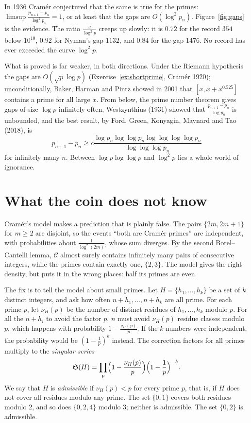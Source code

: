 In 1936 Cramér conjectured that the same is true for the primes: $\limsup\frac{p_{n+1}-p_n}{\log^2p_n}=1$, or at least that the gaps are $O(\log^2p_n)$. Figure~\ref{fig:gaps} is the evidence. The ratio
$\frac g{\log^2p}$ creeps up slowly: it is $0.72$ for the record $354$ below $10^{10}$, $0.92$ for Nyman's gap $1132$, and $0.84$ for the gap $1476$. No record has ever exceeded the curve $\log^2p$.

What is proved is far weaker, in both directions. Under the Riemann hypothesis the gaps are $O(\sqrt p\log p)$ (Exercise~\ref{ex:shortprime}, Cramér 1920); unconditionally, Baker, Harman and Pintz showed in 2001
that $[x,x+x^{0.525}]$ contains a prime for all large $x$. From below, the prime number theorem gives gaps of size $\log p$ infinitely often, Westzynthius (1931) showed that $\frac{p_{n+1}-p_n}{\log p_n}$ is
unbounded, and the best result, by Ford, Green, Konyagin, Maynard and Tao (2018), is
\[
p_{n+1}-p_n\ge c\frac{\log p_n\log\log p_n\log\log\log\log p_n}{\log\log\log p_n}
\]
for infinitely many $n$. Between $\log p\log\log p$ and $\log^2p$ lies a whole world of ignorance.

\section{What the coin does not know}

Cramér's model makes a prediction that is plainly false. The pairs $\{2m,2m+1\}$ for $m\ge2$ are disjoint, so the events ``both are Cramér primes'' are independent, with probabilities about $\frac1{\log^2(2m)}$, whose sum
diverges. By the second Borel--Cantelli lemma, $\mathcal C$ almost surely contains infinitely many pairs of consecutive integers, while the primes contain exactly one, $\{2,3\}$. The model
gives the right density, but puts it in the wrong places: half its primes are even.

The fix is to tell the model about small primes. Let $H=\{h_1,\dots,h_k\}$ be a set of $k$ distinct integers, and ask how often $n+h_1,\dots,n+h_k$ are all prime. For each prime $p$, let $\nu_H(p)$ be
the number of distinct residues of $h_1,\dots,h_k$ modulo $p$. For all the $n+h_i$ to avoid the factor $p$, $n$ must avoid $\nu_H(p)$ residue classes modulo $p$, which happens with probability
$1-\frac{\nu_H(p)}p$. If the $k$ numbers were independent, the probability would be $(1-\frac1p)^k$ instead. The correction factors for all primes multiply to the \emph{singular series}
\[
\mathfrak S(H)=\prod_p\Bigl(1-\frac{\nu_H(p)}p\Bigr)\Bigl(1-\frac1p\Bigr)^{-k}.
\]
We say that $H$ is \emph{admissible} if $\nu_H(p)<p$ for every prime $p$, that is, if $H$ does not cover all residues modulo any prime. The set $\{0,1\}$ covers both residues modulo $2$, and so does
$\{0,2,4\}$ modulo $3$; neither is admissible. The set $\{0,2\}$ is admissible.

